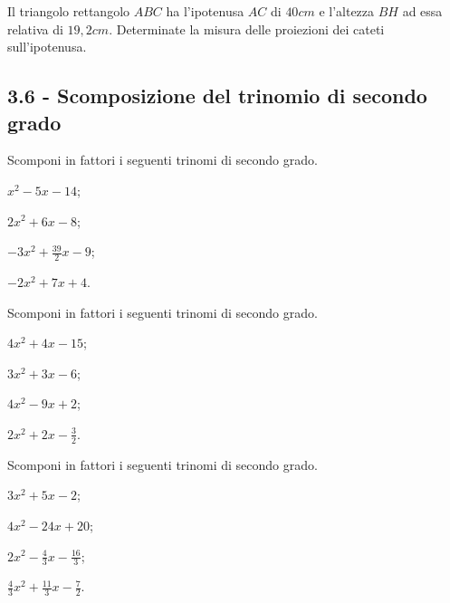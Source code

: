 \begin{esercizio}
 \label{ese:3.83}
Il triangolo rettangolo $ABC$ ha l’ipotenusa $AC$ di $40\unit{cm}$ e l’altezza $BH$ ad essa relativa di $19,2\unit{cm}$. Determinate la misura delle proiezioni dei cateti sull’ipotenusa.
\end{esercizio}

\subsection*{3.6 - Scomposizione del trinomio di secondo grado}


\begin{esercizio}[\Ast]
 \label{ese:3.84}
Scomponi in fattori i seguenti trinomi di secondo grado.
\begin{multicols}{2}
\begin{enumeratea}
\item $x^{2}-5 x-14$;
\item $2 x^{2} + 6 x-8$;
\item $- 3 x^{2} + \frac{39}{2} x-9$;
\item $- 2 x^{2} + 7 x + 4$.
\end{enumeratea}
\end{multicols}
\end{esercizio}

\begin{esercizio}[\Ast]
 \label{ese:3.85}
Scomponi in fattori i seguenti trinomi di secondo grado.
\begin{multicols}{2}
\begin{enumeratea}
\item $4 x^{2} + 4 x-15$;
\item $3 x^{2} + 3 x-6$;
\item $4 x^{2}-9 x + 2$;
\item $2 x^{2} + 2 x - \frac{3}{2}$.
\end{enumeratea}
\end{multicols}
\end{esercizio}

\begin{esercizio}[\Ast]
 \label{ese:3.86}
Scomponi in fattori i seguenti trinomi di secondo grado.
\begin{multicols}{2}
\begin{enumeratea}
\item $3 x^{2} + 5 x - 2$;
\item $4 x^{2}-24 x + 20$;
\item $2 x^{2}-\frac{4}{3} x - \frac{16}{3}$;
\item $\frac{4}{3} x^{2} + \frac{11}{3} x - \frac{7}{2}$.
\end{enumeratea}
\end{multicols}
\end{esercizio}

